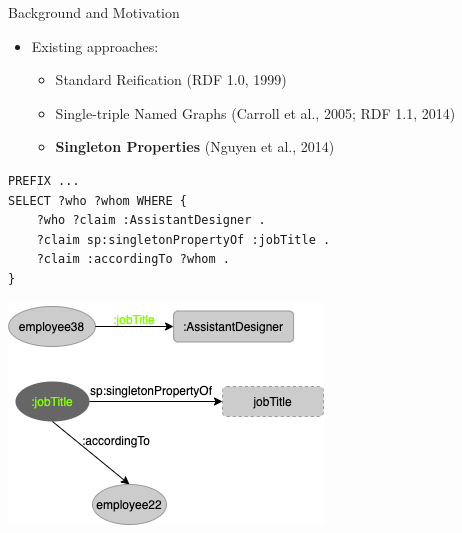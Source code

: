 \documentclass[aspectratio=169]{beamer}
\begin{document}
\begin{frame}[fragile]{Background and Motivation}
    \begin{itemize}
        \item Existing approaches:
            \begin{itemize}
                \item Standard Reification (RDF 1.0, 1999)
                \item Single-triple Named Graphs (Carroll et al., 2005; RDF 1.1, 2014)
                \item \textbf{Singleton Properties} (Nguyen et al., 2014)
            \end{itemize}
    \end{itemize}
    
    \begin{minipage}{0.56\textwidth}
\begin{lstlisting}[language=SPARQL]
PREFIX ...
SELECT ?who ?whom WHERE {
    ?who ?claim :AssistantDesigner .
    ?claim sp:singletonPropertyOf :jobTitle .
    ?claim :accordingTo ?whom .
}
\end{lstlisting}
\end{minipage}
\begin{minipage}{0.43\textwidth}
\centering
	\includegraphics[scale=0.5]{lecture/images/Example-2-SingletonProperties.png}
\end{minipage}
\end{frame}
\end{document}
